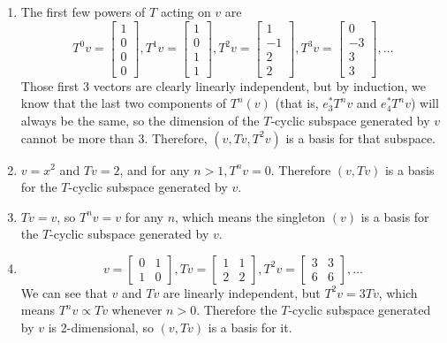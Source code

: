 \documentclass{article}
\begin{document}
\bigskip
\par
\begin{prob}
\end{prob}
\begin{enumerate}[label=(\alph*)]
    \item The first few powers of $T$ acting on $v$ are
        \[ T^0 v = \begin{bmatrix}
            1 \\
            0 \\
            0 \\
            0
        \end{bmatrix}, T^1 v = \begin{bmatrix}
            1 \\
            0 \\
            1 \\
            1
        \end{bmatrix}, T^2 v = \begin{bmatrix}
            1 \\
            -1 \\
            2 \\
            2
        \end{bmatrix}, T^3 v = \begin{bmatrix}
            0 \\
            -3 \\
            3 \\
            3
        \end{bmatrix}, \dots \]
        Those first 3 vectors are clearly linearly independent, but by induction, we know that the last two components of $T^n(v)$ (that is, $e_3^* T^n v$ and $e_4^* T^n v$) will always be the same, so the dimension of the $T$-cyclic subspace generated by $v$ cannot be more than 3. Therefore, $ \left( v, Tv, T^2v \right) $ is a basis for that subspace.
    \item $v=x^2$ and $Tv=2$, and for any $n > 1, T^n v=0$. Therefore $ (v, Tv)$ is a basis for the $T$-cyclic subspace generated by $v$.
    \item $Tv=v$, so $T^nv=v$ for any $n$, which means the singleton $(v)$ is a basis for the $T$-cyclic subspace generated by $v$.
    \item
        \[ v = \begin{bmatrix}
            0 & 1 \\
            1 & 0
        \end{bmatrix}, Tv = \begin{bmatrix}
            1 & 1 \\
            2 & 2
        \end{bmatrix}, T^2 v = \begin{bmatrix}
            3 & 3 \\
            6 & 6
        \end{bmatrix}, \dots \]
        We can see that $v$ and $Tv$ are linearly independent, but $T^2 v = 3 Tv$, which means $T^n v \propto T v$ whenever $n > 0$. Therefore the $T$-cyclic subspace generated by $v$ is 2-dimensional, so $(v, Tv)$ is a basis for it.
\end{enumerate}
\end{document}
